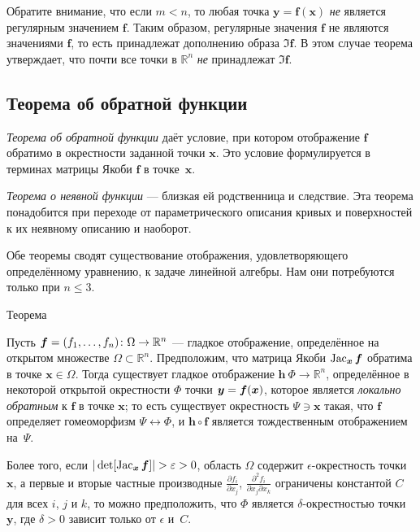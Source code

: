 \begin{multicols}{2}
{Обратите внимание, что если $m<n$, то любая точка $\bm{y}=\bm{f}(\bm{x})$ \textit{не} является регулярным значением $\bm{f}$.
Таким образом, регулярные значения $\bm{f}$ не являются значениями $\bm{f}$, то есть принадлежат дополнению образа $\Im \bm{f}$.
В этом случае теорема утверждает, что почти все точки в $\mathbb{R}^n$ \textit{не} принадлежат $\Im \bm{f}$.

\subsection*{Теорема об обратной функции}

{\sloppy

\emph{Теорема об обратной функции} даёт условие, при котором отображение $\bm{f}$ обратимо в окрестности заданной точки $\bm{x}$.
Это условие формулируется в терминах матрицы Якоби $\bm{f}$ в точке~$\bm{x}$.

}

\emph{Теорема о неявной функции} --- близкая ей родственница и следствие.
Эта теорема понадобится при переходе от параметрического описания кривых и поверхностей к их неявному описанию и наоборот.

Обе теоремы сводят существование отображения, удовлетворяющего определённому уравнению, к задаче линейной алгебры.
Нам они потребуются только при $n\le 3$.

\begin{thm}{Теорема}\label{thm:inverse}
{\sloppy
Пусть $\bm{f}=(f_1,\z\dots,f_n)\:\Omega\to\mathbb{R}^n$ --- гладкое отображение, определённое на открытом множестве $\Omega\subset \mathbb{R}^n$.
Предположим, что матрица Якоби
$\mathop{\rm Jac}\nolimits_{\bm{x}}\bm{f}$
обратима в точке $\bm{x}\in \Omega$.
Тогда существует гладкое отображение $\bm{h}\:\Phi\to\mathbb{R}^n$, определённое в некоторой открытой окрестности $\Phi$ точки ${\bm{y}}\z=\bm{f}(\bm{x})$, которое является {}\emph{локально обратным} к $\bm{f}$ в точке $\bm{x}$;
то есть существует окрестность $\Psi\ni \bm{x}$ такая, что
$\bm{f}$ определяет гомеоморфизм $\Psi\leftrightarrow \Phi$, и
$\bm{h} \circ \bm{f}$ является тождественным отображением на~$\Psi$.

}

Более того, если $|\det[\Jac_{\bm{x}}\bm{f}]|\z>\epsilon\z>0$, область $\Omega$ содержит $\epsilon$-окрестность точки $\bm{x}$,
а первые и вторые частные производные $\tfrac{\partial f_i}{\partial x_j}$, $\tfrac{\partial^2 f_i}{\partial x_j\partial x_k}$ ограничены константой $C$ для всех $i$, $j$ и $k$, то можно предположить, что $\Phi$ является $\delta$-окрестностью точки $\bm{y}$, где $\delta>0$ зависит только от $\epsilon$ и~$C$. 
\end{thm}

}
\end{multicols}
